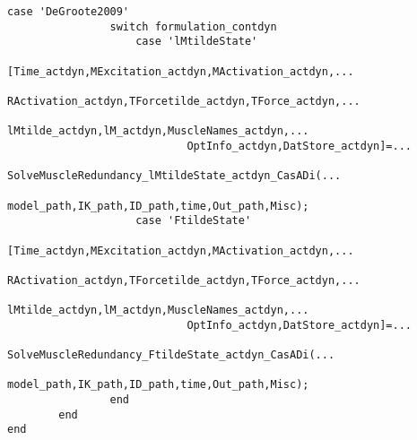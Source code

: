 \documentclass[a4paper,oneside,11pt]{article}
\begin{document}
\begin{lstlisting}[frame=none,basicstyle=\tiny]
            case 'DeGroote2009'
                switch formulation_contdyn
                    case 'lMtildeState'
                        [Time_actdyn,MExcitation_actdyn,MActivation_actdyn,...
                            RActivation_actdyn,TForcetilde_actdyn,TForce_actdyn,...
                            lMtilde_actdyn,lM_actdyn,MuscleNames_actdyn,...
                            OptInfo_actdyn,DatStore_actdyn]=...
                            SolveMuscleRedundancy_lMtildeState_actdyn_CasADi(...
                            model_path,IK_path,ID_path,time,Out_path,Misc);
                    case 'FtildeState'   
                        [Time_actdyn,MExcitation_actdyn,MActivation_actdyn,...
                            RActivation_actdyn,TForcetilde_actdyn,TForce_actdyn,...
                            lMtilde_actdyn,lM_actdyn,MuscleNames_actdyn,...
                            OptInfo_actdyn,DatStore_actdyn]=...
                            SolveMuscleRedundancy_FtildeState_actdyn_CasADi(...
                            model_path,IK_path,ID_path,time,Out_path,Misc);
                end
        end
end

\end{lstlisting}
\end{document}
